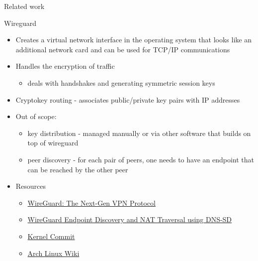 \begin{frame}[fragile]{Related work}
\begin{block}{Wireguard}
\newpage

\begin{Shaded}
\begin{Highlighting}[]
\KeywordTok{[Interface]}
\OtherTok{=}
\OtherTok{=}\StringTok{ }
\OtherTok{=}

\KeywordTok{[Peer]}
\OtherTok{=}
\OtherTok{=}
\OtherTok{=}
\OtherTok{=}\StringTok{ }
\end{Highlighting}
\end{Shaded}

\begin{itemize}
\tightlist
\item
  Creates a virtual network interface in the operating system that looks
  like an additional network card and can be used for TCP/IP
  communications
\item
  Handles the encryption of traffic

  \begin{itemize}
  \tightlist
  \item
    deals with handshakes and generating symmetric session keys
  \end{itemize}
\item
  Cryptokey routing - associates public/private key pairs with IP
  addresses
\item
  Out of scope:

  \begin{itemize}
  \tightlist
  \item
    key distribution - managed manually or via other software that
    builds on top of wireguard
  \item
    peer discovery - for each pair of peers, one needs to have an
    endpoint that can be reached by the other peer
  \end{itemize}
\item
  Resources

  \begin{itemize}
  \tightlist
  \item
    \href{https://blogs.keysight.com/blogs/tech/nwvs.entry.html/2022/09/22/wireguard_the_next-genvpnprotocol-OcEz.html}{WireGuard:
    The Next-Gen VPN Protocol}
  \item
    \href{https://www.jordanwhited.com/posts/wireguard-endpoint-discovery-nat-traversal/}{WireGuard
    Endpoint Discovery and NAT Traversal using DNS-SD}
  \item
    \href{https://git.kernel.org/pub/scm/linux/kernel/git/torvalds/linux.git/commit/?id=e7096c131e5161fa3b8e52a650d7719d2857adfd}{Kernel
    Commit}
  \item
    \href{https://wiki.archlinux.org/title/WireGuard}{Arch Linux Wiki}
  \end{itemize}
\end{itemize}
\end{block}


\end{frame}
